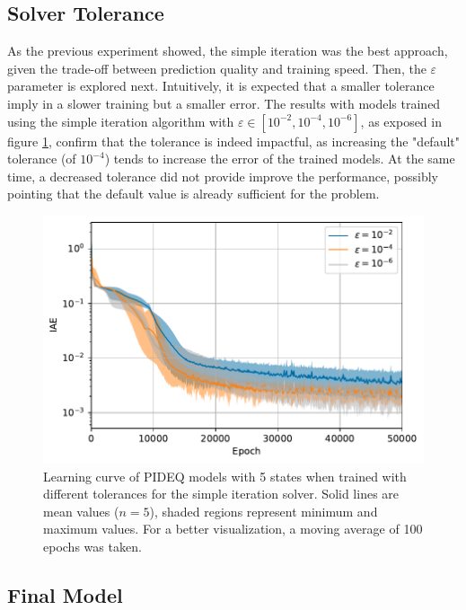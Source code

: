 \subsection{Solver Tolerance}

As the previous experiment showed, the simple iteration was the best approach, given the trade-off between prediction quality and training speed.
Then, the $\varepsilon$ parameter is explored next.
Intuitively, it is expected that a smaller tolerance imply in a slower training but a smaller error.
The results with models trained using the simple iteration algorithm with $\varepsilon \in \left[ 10^{-2}, 10^{-4},10^{-6} \right] $, as exposed in figure \ref{fig:epsilon-iae}, confirm that the tolerance is indeed impactful, as increasing the "default" tolerance (of $10^{-4}$) tends to increase the error of the trained models.
At the same time, a decreased tolerance did not provide improve the performance, possibly pointing that the default value is already sufficient for the problem.

\begin{figure}[h]
    \centering
    \includegraphics{images/exp_6_iae.pdf}
    \caption{Learning curve of \gls{PIDEQ} models with 5 states when trained with different tolerances for the simple iteration solver. Solid lines are mean values ($n=5$), shaded regions represent minimum and maximum values. For a better visualization, a moving average of 100 epochs was taken.}
    \label{fig:epsilon-iae}
\end{figure}

\subsection{Final Model}

